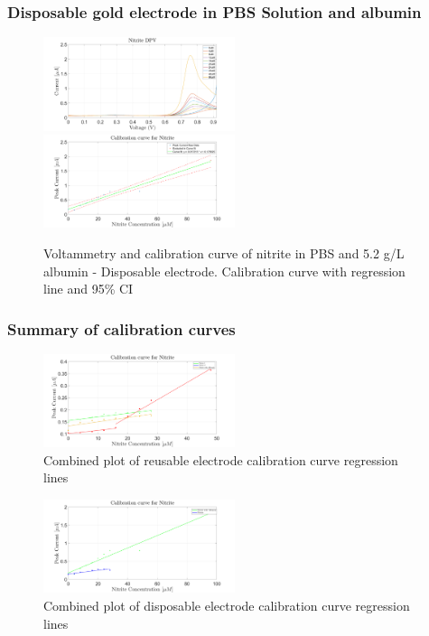\subsubsection{Disposable gold electrode in PBS Solution and albumin}
\begin{figure}[H]
    \centering
    \includegraphics[width = 0.5\textwidth]{img/disp albumin.png} \includegraphics[width = 0.5\textwidth]{img/disp albumin calibration.png}
    \caption{Voltammetry and calibration curve of nitrite in PBS and 5.2 g/L albumin - Disposable electrode. Calibration curve with regression line and 95\% CI}
    \label{fig:nitrite_result_4}
\end{figure}

\subsubsection{Summary of calibration curves}
\begin{figure}[H]
    \centering
    \includegraphics[width = 0.5\textwidth]{img/combinedreus new.png}
    \caption{Combined plot of reusable electrode calibration curve regression lines}
    \label{fig:nitrite_calibration_1}
\end{figure}

\begin{figure}[H]
    \centering
    \includegraphics[width = 0.5\textwidth]{img/combined disp.png}
    \caption{Combined plot of disposable electrode calibration curve regression lines}
    \label{fig:nitrite_calibration_2}
\end{figure}

